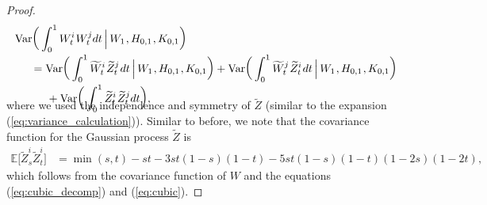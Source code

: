 \documentclass[sn-mathphys-num]{sn-jnl}%
\newcommand{\E}{\mathbb{E}}
\newcommand{\m}{\hspace{0.25mm}}
\newcommand{\mm}{\hspace{5mm}}
\newcommand{\var}{\mathrm{Var}}
\begin{document}
\begin{proof}
\begin{align*}
&\var\bigg(\int_0^1 W_t^i\m W_t^j dt\, \Big|\, W_1\m, H_{0,1}\m, K_{0,1}\bigg)\\[-2pt]
&\mm = \var\bigg(\int_0^1 \widetilde{W}_t^i\m \widetilde{Z}_t^j\m dt\, \Big|\, W_1\m, H_{0,1}\m, K_{0,1}\bigg) + \var\bigg(\int_0^1 \widetilde{W}_t^j\m \widetilde{Z}_t^i\m dt\, \Big|\, W_1\m, H_{0,1}\m, K_{0,1}\bigg)\\[-2pt]
&\mm\mm + \var\bigg(\int_0^1 \widetilde{Z}_t^i\m\widetilde{Z}_t^j dt\bigg),\\[-20pt]
\end{align*}
where we used the independence and symmetry of $\widetilde{Z}$ (similar to the expansion (\ref{eq:variance_calculation})).
Similar to before, we note that the covariance function for the Gaussian process $\widetilde{Z}$ is
\begin{align*}
\E\big[\widetilde{Z}_s^i \widetilde{Z}_t^i\big] & = \min(s,t) - st - 3st(1-s)(1-t) - 5st(1-s)(1-t)(1-2s)(1-2t),
\end{align*}
which follows from the covariance function of $W$ and the equations (\ref{eq:cubic_decomp}) and (\ref{eq:cubic}).


\end{proof}
\end{document}
